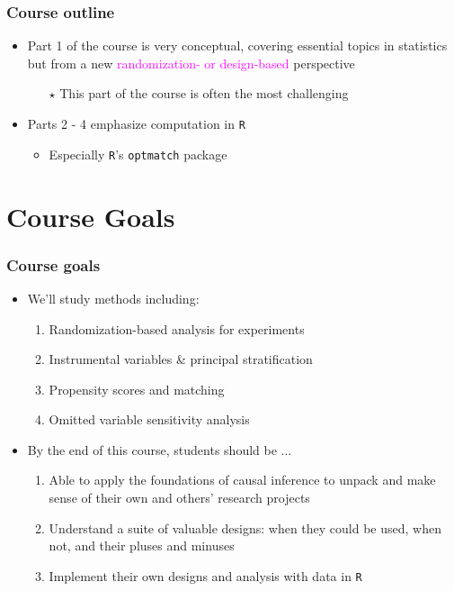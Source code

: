 \documentclass[table, xcolor = {dvipsnames}, 9pt]{beamer}
\theoremstyle{plain}
\begin{document}
\begin{frame}[t]
\frametitle{Course outline}
\vfill
\begin{itemize} \vfill
\item Part 1 of the course is very conceptual, covering essential topics in statistics but from a new \textcolor{magenta}{randomization- or design-based} perspective \vfill
\begin{itemize} \vfill
\item[$\star$] This part of the course is often the most challenging \vfill
\end{itemize} \vfill
\item Parts 2 - 4 emphasize computation in \texttt{R} \vfill
\begin{itemize} \vfill
\item Especially \texttt{R}'s \texttt{optmatch} package \vfill
\end{itemize} \vfill
\end{itemize} \vfill
\vfill
\end{frame}
\section{Course Goals}
\begin{frame}[t]
\frametitle{Course goals}
\vfill
\begin{itemize} \vfill
\item We'll study methods including:  \vfill
  \begin{enumerate}
    \item Randomization-based analysis for experiments  \vfill
  \item Instrumental variables \& principal stratification  \vfill
  \item Propensity scores and matching  \vfill
  \item Omitted variable sensitivity analysis  \vfill
  \end{enumerate}
\item By the end of this course, students should be ...
\begin{enumerate} \vfill
\item Able to apply the foundations of causal inference to unpack and make sense of their own and others' research projects \vfill
\item Understand a suite of valuable designs: when they could be used, when not, and their pluses and minuses \vfill
\item Implement their own designs and analysis with data in \texttt{R} \vfill
\end{enumerate} \vfill
\end{itemize} \vfill
\vfill
\end{frame}
\end{document}
